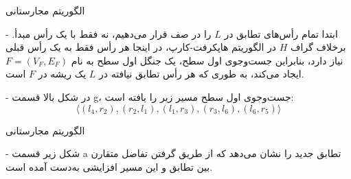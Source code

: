 \begin{itemframe}{الگوریتم مجارستانی}
\item[-]
ابتدا تمام رأس‌های تطابق در $L$ را در صف قرار می‌دهیم، نه فقط با یک رأس مبدأ.
برخلاف گراف $H$ در الگوریتم هاپکرفت-کارپ، در اینجا هر رأس فقط به یک رأس قبلی نیاز دارد، بنابراین جست‌وجوی اول سطح، یک جنگل اول سطح
به نام $F = (V_F, E_F)$ ایجاد می‌کند، به طوری که هر رأس تطابق نیافته در $L$ یک ریشه در $F$ است.
\item[-]
در شکل بالا قسمت g، جست‌وجوی اول سطح مسیر زیر را یافته است:
$$
\langle (l_4, r_2), (r_2, l_1), (l_1, r_3), (r_3, l_6), (l_6, r_5) \rangle
$$

\end{itemframe}


\begin{itemframe}{الگوریتم مجارستانی}
\item[-]
شکل زیر قسمت a تطابق جدید را نشان می‌دهد که از طریق گرفتن تفاضل متقارن بین تطابق و این مسیر افزایشی به‌دست آمده است.
\end{itemframe}
